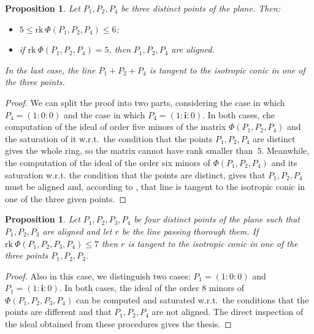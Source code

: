 \documentclass[12pt, a4paper, reqno, captions=tableheading,bibliography=totoc]{scrartcl}
\theoremstyle{plain}
\newtheorem{prop}[lemma]{Proposition}
\theoremstyle{definition}
\newcommand{\iii}{\textbf{i}}
\begin{document}
\begin{prop}
\label{manca il riferimento su ancillary    non e': condition_rank_aligned}
Let $P_1, P_2, P_4$ be three distinct points of the plane. Then:
\begin{itemize}
\item $5 \leq \text{rk}\ \Phi(P_1, P_2, P_4) \leq 6$;
\item if
$\text{rk}\ \Phi(P_1, P_2, P_4) = 5$, then $P_1, P_2, P_4$
 are aligned.
\end{itemize}
In the last case, the line $P_1+P_2+P_4$ is tangent to the isotropic conic
in one of the three points.
\end{prop}
\begin{proof}
We can split the proof into two parts, considering the case in
which $P_4 = (1: 0: 0)$ and the case in which $P_4 = (1: \iii: 0)$.
In both cases, che computation of the ideal of order five minors of the matrix
$\Phi(P_1, P_2, P_4)$ and the saturation of it w.r.t.\ the condition
that the points $P_1, P_2, P_4$ are distinct gives the whole ring, so
the matrix cannot have rank smaller than~$5$. Meanwhile, the computation
of the ideal of the order six minors of $\Phi(P_1, P_2, P_4)$ and its
saturation w.r.t. the condition that the points are distinct, gives that
$P_1, P_2, P_4$ must be aligned and, according to ,
that line is tangent to the isotropic conic in one of the three given points.
\end{proof}


\begin{prop}
\label{prop:condition3+1}
Let $P_1, P_2, P_3, P_4$ be four distinct points of the plane such that
$P_1, P_2, P_3$ are aligned and let $r$
be the line passing thorough them. If
$\text{rk}\ \Phi(P_1, P_2, P_3, P_4) \leq 7$ then $r$ is tangent to the
isotropic conic in one of the three points $P_1, P_2, P_3$.
\end{prop}
\begin{proof}
Also in this case, we distinguish two cases: $P_1 = (1: 0: 0)$ and
$P_1 = (1: \iii: 0)$. In both cases, the ideal of the order $8$
minors of $\Phi(P_1, P_2, P_3, P_4)$ can be computed and saturated
w.r.t.\ the conditions that the points are different and that
$P_1, P_2, P_4$ are not aligned.
The direct inspection of the ideal obtained from these procedures gives the thesis.
\end{proof}
\end{document}
